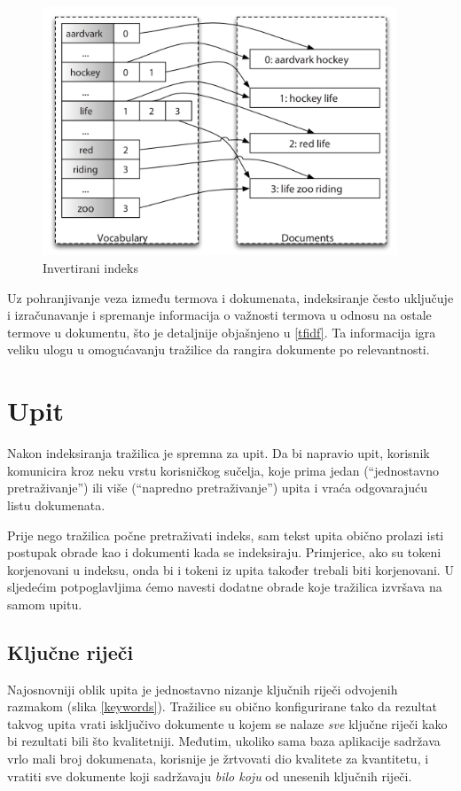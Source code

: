 \documentclass[a4paper,twoside,12pt]{scrreprt}
\begin{document}
\begin{figure}[H]
  \centering
  \includegraphics[width=300pt]{inverted_index}
  \caption{Invertirani indeks}
  \label{inverted_index}
\end{figure}

Uz pohranjivanje veza između termova i dokumenata, indeksiranje često uključuje i izračunavanje i spremanje informacija o važnosti termova u odnosu na ostale termove u dokumentu, što je detaljnije objašnjeno u \ref{tfidf}. Ta informacija igra veliku ulogu u omogućavanju tražilice da rangira dokumente po relevantnosti.

\section{Upit}

Nakon indeksiranja tražilica je spremna za upit. Da bi napravio upit, korisnik komunicira kroz neku vrstu korisničkog sučelja, koje prima jedan (``jednostavno pretraživanje'') ili više (``napredno pretraživanje'') upita i vraća odgovarajuću listu dokumenata.

Prije nego tražilica počne pretraživati indeks, sam tekst upita obično prolazi isti postupak obrade kao i dokumenti kada se indeksiraju. Primjerice, ako su tokeni korjenovani u indeksu, onda bi i tokeni iz upita također trebali biti korjenovani. U sljedećim potpoglavljima ćemo navesti dodatne obrade koje tražilica izvršava na samom upitu.

\subsection{Ključne riječi}

Najosnovniji oblik upita je jednostavno nizanje ključnih riječi odvojenih razmakom (slika \ref{keywords}). Tražilice su obično konfigurirane tako da rezultat takvog upita vrati isključivo dokumente u kojem se nalaze \textit{sve} ključne riječi kako bi rezultati bili što kvalitetniji. Međutim, ukoliko sama baza aplikacije sadržava vrlo mali broj dokumenata, korisnije je žrtvovati dio kvalitete za kvantitetu, i vratiti sve dokumente koji sadržavaju \textit{bilo koju} od unesenih ključnih riječi.
\end{document}
